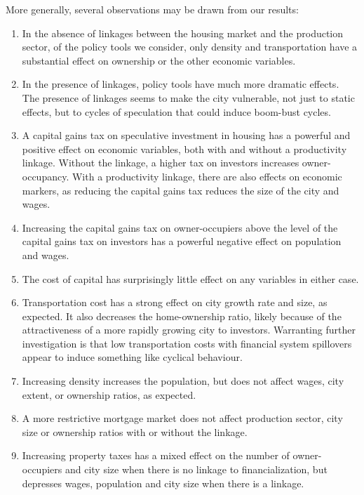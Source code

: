More generally, several observations may be drawn from our results: 
\begin{enumerate}
\item In the absence of linkages between the housing market and the production sector, of the policy tools we consider, only density and transportation have a substantial effect on ownership or the other economic variables. %

\item In the presence of linkages, policy tools have much more dramatic effects. %
The presence of linkages seems to make the city vulnerable, not just to static effects, but to cycles of speculation that could induce boom-bust cycles. 


\item A capital gains tax on speculative investment in housing has a powerful and positive effect on economic variables, both with and without a productivity linkage. Without the linkage, a higher tax on investors increases owner-occupancy. With a productivity linkage, there are also effects on economic markers, as reducing the capital gains tax reduces the size of the city and wages. 

\item Increasing the capital gains tax on owner-occupiers above the level of the capital gains tax on investors has a powerful negative effect on population and wages.

\item The cost of capital has surprisingly little effect on any variables in either case.

\item Transportation cost has a strong effect on city growth rate and size, as expected. It also decreases the home-ownership ratio, likely because of the attractiveness of a more rapidly growing city to investors. Warranting further investigation is that low transportation costs with financial system spillovers appear to induce something like cyclical behaviour.

\item Increasing density increases the population, but does not affect wages, city extent, or ownership ratios, as expected.

\item A more restrictive mortgage market does not affect production sector, city size or ownership ratios with or without the linkage.

\item Increasing property taxes has a mixed effect on the number of owner-occupiers and city size when there is no linkage to financialization, but depresses wages, population and city size when there is a linkage. 
\end{enumerate}
